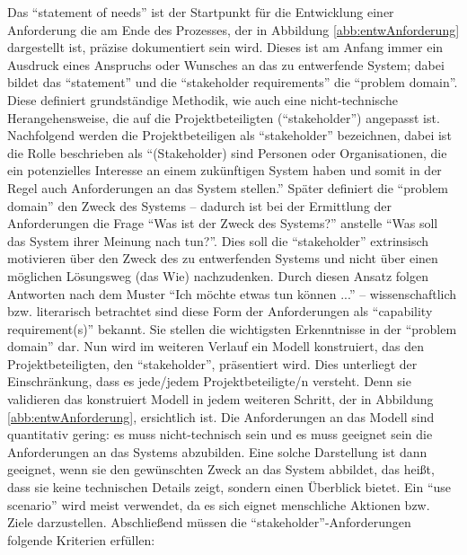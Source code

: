 Das \enquote{statement of needs} ist der Startpunkt für die Entwicklung einer Anforderung die am Ende des Prozesses, der in Abbildung \vref{abb:entwAnforderung} dargestellt ist, präzise dokumentiert sein wird. Dieses ist am Anfang immer ein Ausdruck eines Anspruchs oder Wunsches an das zu entwerfende System; dabei bildet das \enquote{statement} und die \enquote{stakeholder requirements} die \enquote{problem domain}. Diese definiert grundständige Methodik, wie auch eine nicht-technische Herangehensweise, die auf die Projektbeteiligten (\enquote{stakeholder}) angepasst ist. Nachfolgend werden die Projektbeteiligen als \enquote{stakeholder} bezeichnen, dabei ist die Rolle beschrieben als \enquote{(Stakeholder) sind Personen oder Organisationen, die ein potenzielles Interesse an einem zukünftigen System haben und somit in der Regel auch Anforderungen an das System stellen.}\autocite[][S.8]{partsch_requirements-engineering_2010} Später definiert die \enquote{problem domain} den Zweck des Systems -- dadurch ist bei der Ermittlung der Anforderungen die Frage \enquote{Was ist der Zweck des Systems?} anstelle \enquote{Was soll das System ihrer Meinung nach tun?}. Dies soll die \enquote{stakeholder} extrinsisch motivieren über den Zweck des zu entwerfenden Systems und nicht über einen möglichen Lösungsweg (das Wie) nachzudenken. Durch diesen Ansatz folgen Antworten nach dem Muster \enquote{Ich möchte etwas tun können ...} -- wissenschaftlich bzw. literarisch betrachtet sind diese Form der Anforderungen als \enquote{capability requirement(s)}\autocite[vgl.][S.94]{hull_requirements_2011} bekannt. Sie stellen die wichtigsten Erkenntnisse in der \enquote{problem domain} dar. Nun wird im weiteren Verlauf ein Modell konstruiert, das den Projektbeteiligten, den \enquote{stakeholder}, präsentiert wird. Dies unterliegt der Einschränkung, dass es jede/jedem Projektbeteiligte/n versteht. Denn sie validieren das konstruiert Modell in jedem weiteren Schritt, der in Abbildung \vref{abb:entwAnforderung}, ersichtlich ist. Die Anforderungen an das Modell sind quantitativ gering: es muss nicht-technisch sein und es muss geeignet sein die Anforderungen an das Systems abzubilden. Eine solche Darstellung ist dann geeignet, wenn sie den gewünschten Zweck an das System abbildet, das heißt, dass sie keine technischen Details zeigt, sondern einen Überblick bietet. Ein \enquote{use scenario}\autocite[vgl.][S.94]{hull_requirements_2011} wird meist verwendet, da es sich eignet menschliche Aktionen bzw. Ziele darzustellen. Abschließend müssen die \enquote{stakeholder}-Anforderungen folgende Kriterien erfüllen: 

